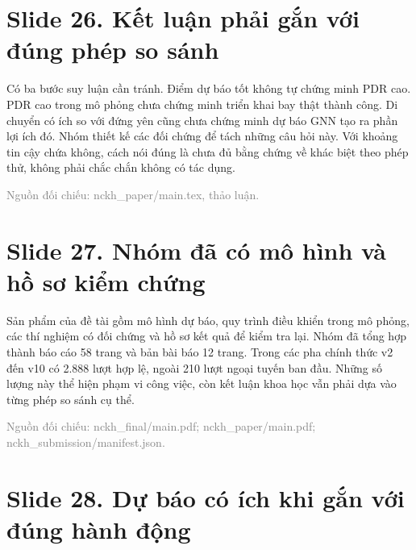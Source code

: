 
\section*{Slide 26. Kết luận phải gắn với đúng phép so sánh}


Có ba bước suy luận cần tránh. Điểm dự báo tốt không tự chứng minh PDR cao. PDR cao trong mô phỏng chưa chứng minh triển khai bay thật thành công. Di chuyển có ích so với đứng yên cũng chưa chứng minh dự báo GNN tạo ra phần lợi ích đó. Nhóm thiết kế các đối chứng để tách những câu hỏi này. Với khoảng tin cậy chứa không, cách nói đúng là chưa đủ bằng chứng về khác biệt theo phép thử, không phải chắc chắn không có tác dụng.

{\small\textcolor{gray}{Nguồn đối chiếu: nckh\_paper/main.tex, thảo luận.}}




\section*{Slide 27. Nhóm đã có mô hình và hồ sơ kiểm chứng}


Sản phẩm của đề tài gồm mô hình dự báo, quy trình điều khiển trong mô phỏng, các thí nghiệm có đối chứng và hồ sơ kết quả để kiểm tra lại. Nhóm đã tổng hợp thành báo cáo 58 trang và bản bài báo 12 trang. Trong các pha chính thức v2 đến v10 có 2.888 lượt hợp lệ, ngoài 210 lượt ngoại tuyến ban đầu. Những số lượng này thể hiện phạm vi công việc, còn kết luận khoa học vẫn phải dựa vào từng phép so sánh cụ thể.

{\small\textcolor{gray}{Nguồn đối chiếu: nckh\_final/main.pdf; nckh\_paper/main.pdf; nckh\_submission/manifest.json.}}




\section*{Slide 28. Dự báo có ích khi gắn với đúng hành động}


